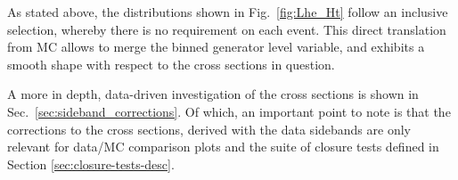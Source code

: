 As stated above, the distributions shown in Fig.~\ref{fig:Lhe_Ht} follow an inclusive selection, whereby there is no requirement on each event. This direct translation
from MC allows to merge the binned generator level variable, and exhibits a smooth shape with respect to the cross sections in question.

A more in depth, data-driven investigation of the cross sections is shown in Sec.~\ref{sec:sideband_corrections}. Of which, an important point to note is that
the corrections to the cross sections, derived with the data sidebands are only relevant for data/MC comparison plots and the suite of closure tests defined in Section \ref{sec:closure-tests-desc}.

\begin{figure}[!h]
  \begin{center}
     ~~
     \\
     ~~

\end{center}
\end{figure}

